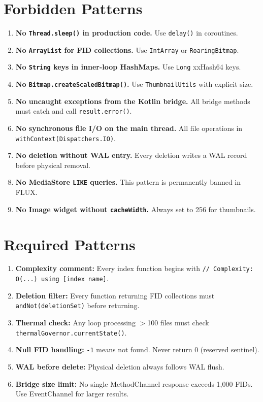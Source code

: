 \section{Forbidden Patterns}

\begin{enumerate}
  \item \textbf{No \texttt{Thread.sleep()} in production code.} Use \texttt{delay()} in coroutines.
  \item \textbf{No \texttt{ArrayList} for FID collections.} Use \texttt{IntArray} or \texttt{RoaringBitmap}.
  \item \textbf{No \texttt{String} keys in inner-loop HashMaps.} Use \texttt{Long} xxHash64 keys.
  \item \textbf{No \texttt{Bitmap.createScaledBitmap()}.} Use \texttt{ThumbnailUtils} with explicit size.
  \item \textbf{No uncaught exceptions from the Kotlin bridge.} All bridge methods must catch and call \texttt{result.error()}.
  \item \textbf{No synchronous file I/O on the main thread.} All file operations in \texttt{withContext(Dispatchers.IO)}.
  \item \textbf{No deletion without WAL entry.} Every deletion writes a WAL record before physical removal.
  \item \textbf{No MediaStore \texttt{LIKE} queries.} This pattern is permanently banned in FLUX.
  \item \textbf{No Image widget without \texttt{cacheWidth}.} Always set to 256 for thumbnails.
\end{enumerate}

\section{Required Patterns}

\begin{enumerate}
  \item \textbf{Complexity comment:} Every index function begins with \texttt{// Complexity: O(...) using [index name]}.
  \item \textbf{Deletion filter:} Every function returning FID collections must \texttt{andNot(deletionSet)} before returning.
  \item \textbf{Thermal check:} Any loop processing $>$100 files must check \texttt{thermalGovernor.currentState()}.
  \item \textbf{Null FID handling:} \texttt{-1} means not found. Never return 0 (reserved sentinel).
  \item \textbf{WAL before delete:} Physical deletion always follows WAL flush.
  \item \textbf{Bridge size limit:} No single MethodChannel response exceeds 1,000 FIDs. Use EventChannel for larger results.
\end{enumerate}

